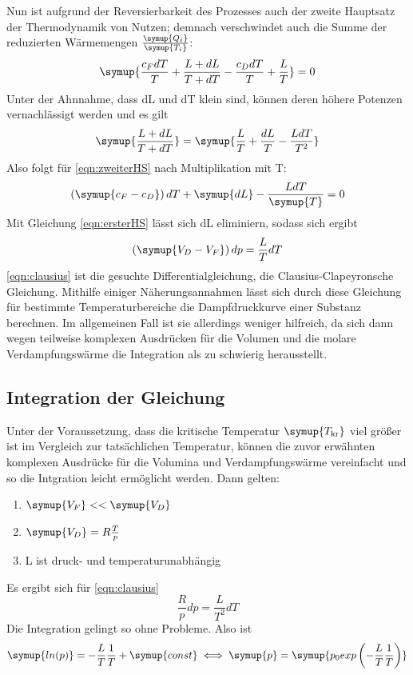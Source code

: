 Nun ist aufgrund der Reversierbarkeit des Prozesses auch der zweite Hauptsatz der
Thermodynamik von Nutzen; demnach verschwindet auch die Summe der reduzierten
Wärmemengen $\frac{\symup{Q_i}}{\symup{T_i}}$:
\begin{equation}
\symup{\frac{c_F dT}{T} + \frac{L + dL}{T + dT} - \frac{c_D dT}{T} + \frac{L}{T}} = 0
\label{eqn:zweiterHS}
\end{equation}
Unter der Ahnnahme, dass dL und dT klein sind, können deren höhere Potenzen 
vernachlässigt werden und es gilt
\begin{equation}
\symup{\frac{L + dL}{T + dT}} = \symup{\frac{L}{T} + \frac{dL}{T} - \frac{L dT}{T^2}}
\end{equation}
Also folgt für \eqref{eqn:zweiterHS} nach Multiplikation mit T:
\begin{equation}
\left( \symup{c_F - c_D} \right) dT + \symup{dL} - \frac{L dT}{\symup{T}} = 0
\end{equation}
Mit Gleichung \eqref{eqn:ersterHS} lässt sich dL eliminiern, sodass sich ergibt
\begin{equation}
    \left( \symup{ V_D - V_F} \right) dp = \frac{L}{T} dT
    \label{eqn:clausius}
\end{equation}
\eqref{eqn:clausius} ist die gesuchte Differentialgleichung, die Clausius-Clapeyronsche
Gleichung. Mithilfe einiger Näherungsannahmen lässt sich durch diese Gleichung
für bestimmte Temperaturbereiche die Dampfdruckkurve einer Substanz berechnen. Im 
allgemeinen Fall ist sie allerdings weniger hilfreich, da sich dann wegen teilweise
komplexen Ausdrücken für die Volumen und die molare Verdampfungswärme die Integration
als zu schwierig herausstellt.

\subsection{Integration der Gleichung}
Unter der Voraussetzung, dass die kritische Temperatur $\symup{T_\text{kr}}$ viel größer
ist im Vergleich zur tatsächlichen Temperatur, können die zuvor erwähnten komplexen
Ausdrücke für die Volumina und Verdampfungswärme vereinfacht und so die Intgration 
leicht ermöglicht werden. Dann gelten:
\begin{enumerate}
    \item $\symup{V_F} << \symup{V_D}$
    \item $\symup{V_D} = R \frac{T}{p}$
    \item L ist druck- und temperaturunabhängig
\end{enumerate}
Es ergibt sich für \eqref{eqn:clausius}
\begin{equation*}
\frac{R}{p} dp = \frac{L}{T^2} dT
\end{equation*}
Die Integration gelingt so ohne Probleme. Also ist
\begin{equation}
\symup{ln(p)} = - \frac{L}{T} \frac{1}{T} + \symup{const}\\
\iff \symup{p} = \symup{p_0 exp \left( - \frac{L}{T} \frac{1}{T} \right)}
\end{equation}
